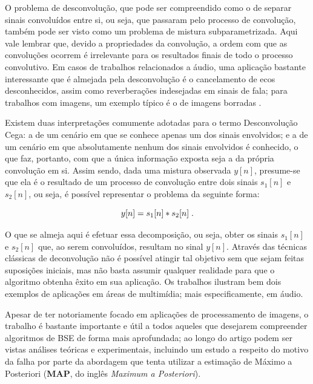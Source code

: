 O problema de desconvolução, que pode ser compreendido como o de separar sinais convoluídos entre si, ou seja, que passaram pelo processo de convolução, também pode ser visto como um problema de mistura subparametrizada. Aqui vale lembrar que, devido a propriedades da convolução, a ordem com que as convoluções ocorrem é irrelevante para os resultados finais de todo o processo convolutivo. Em casos de trabalhos relacionados a áudio, uma aplicação bastante interessante que é almejada pela desconvolução é o cancelamento de ecos desconhecidos, assim como reverberações indesejadas em sinais de fala; para trabalhos com imagens, um exemplo típico é o de imagens borradas \citep{Bell:1995:IAB:211676.211677}.

Existem duas interpretações comumente adotadas para o termo Desconvolução Cega: a de um cenário em que se conhece apenas um dos sinais envolvidos; e a de um cenário em que absolutamente nenhum dos sinais envolvidos é conhecido, o que faz, portanto, com que a única informação exposta seja a da própria convolução em si. Assim sendo, dada uma mistura observada $y[n]$, presume-se que ela é o resultado de um processo de convolução entre dois sinais $s_{1}[n]$ e $s_{2}[n]$, ou seja, é possível representar o problema da seguinte forma:

\begin{equation}
    y[n] = s_{1}[n] \ast s_{2}[n]
    \label{eq:bss_deconvolution}
    \hspace{0.1cm}.
    \vspace{0.2cm}
\end{equation}

O que se almeja aqui é efetuar essa decomposição, ou seja, obter os sinais $s_{1}[n]$ e $s_{2}[n]$ que, ao serem convoluídos, resultam no sinal $y[n]$. Através das técnicas clássicas de deconvolução não é possível atingir tal objetivo sem que sejam feitas suposições iniciais, mas não basta assumir qualquer realidade para que o algoritmo obtenha êxito em sua aplicação. Os trabalhos \citep{661479, 7077344} ilustram bem dois exemplos de aplicações em áreas de multimídia; mais especificamente, em áudio.


Apesar de ter notoriamente focado em aplicações de processamento de imagens, o trabalho \citep{levin2009understanding} é bastante importante e útil a todos aqueles que desejarem compreender algoritmos de BSE de forma mais aprofundada; ao longo do artigo podem ser vistas análises teóricas e experimentais, incluindo um estudo a respeito do motivo da falha por parte da abordagem que tenta utilizar a estimação de Máximo a Posteriori (\textbf{MAP}, do inglês \textit{Maximum a Posteriori}).






